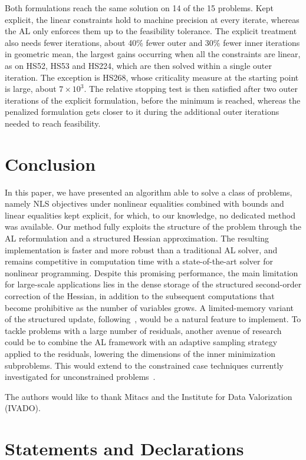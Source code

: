 \documentclass[pdflatex,sn-mathphys-num]{sn-jnl}%
\theoremstyle{thmstyleone}%
\begin{document}
Both formulations reach the same solution on 14 of the 15 problems. Kept explicit, the linear constraints hold to machine precision at every iterate, whereas the AL only enforces them up to the feasibility tolerance. The explicit treatment also needs fewer iterations, about 40\% fewer outer and 30\% fewer inner iterations in geometric mean, the largest gains occurring when all the constraints are linear, as on HS52, HS53 and HS224, which are then solved within a single outer iteration. The exception is HS268, whose criticality measure at the starting point is large, about $7\times10^3$. The relative stopping test is then satisfied after two outer iterations of the explicit formulation, before the minimum is reached, whereas the penalized formulation gets closer to it during the additional outer iterations needed to reach feasibility.

\section{Conclusion}
In this paper, we have presented an algorithm able to solve a class of problems, namely NLS objectives under nonlinear equalities combined with bounds and linear equalities kept explicit, for which, to our knowledge, no dedicated method was available. Our method fully exploits the structure of the problem through the AL reformulation and a structured Hessian approximation. The resulting implementation is faster and more robust than a traditional AL solver, and remains competitive in computation time with a state-of-the-art solver for nonlinear programming. Despite this promising performance, the main limitation for large-scale applications lies in the dense storage of the structured second-order correction of the Hessian, in addition to the subsequent computations that become prohibitive as the number of variables grows. A limited-memory variant of the structured update, following~\cite{byrd-etal:1994}, would be a natural feature to implement. To tackle problems with a large number of residuals, another avenue of research could be to combine the AL framework with an adaptive sampling strategy applied to the residuals, lowering the dimensions of the inner minimization subproblems. This would extend to the constrained case techniques currently investigated for unconstrained problems~\cite{bellavia-etal:2026}.

 The authors would like to thank Mitacs and the Institute for Data Valorization (IVADO).

\section*{Statements and Declarations}
\end{document}
